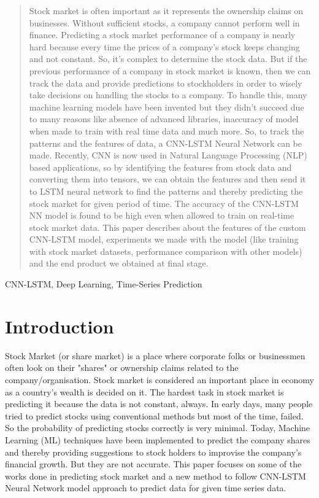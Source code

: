 \documentclass[conference]{IEEEtran}
\begin{document}
\begin{abstract}
Stock market is often important as it represents the ownership claims on businesses. Without sufficient stocks, a company cannot perform well in finance. Predicting a stock market performance of a company is nearly hard because every time the prices of a company’s stock keeps changing and not constant. So, it’s complex to determine the stock data. But if the previous performance of a company in stock market is known, then we can track the data and provide predictions to stockholders in order to wisely take decisions on handling the stocks to a company. To handle this, many machine learning models have been invented but they didn't succeed due to many reasons like absence of advanced libraries, inaccuracy of model when made to train with real time data and much more. So, to track the patterns and the features of data, a CNN-LSTM Neural Network can be made. Recently, CNN is now used in Natural Language Processing (NLP) based applications, so by identifying the features from stock data and converting them into tensors, we can obtain the features and then send it to LSTM neural network to find the patterns and thereby predicting the stock market for given period of time. The accuracy of the CNN-LSTM NN model is found to be high even when allowed to train on real-time stock market data. This paper describes about the features of the custom CNN-LSTM model, experiments we made with the model (like training with stock market datasets, performance comparison with other models) and the end product we obtained at final stage.
\end{abstract}

\begin{IEEEkeywords}
CNN-LSTM, Deep Learning, Time-Series Prediction
\end{IEEEkeywords}

\section{Introduction}
Stock Market (or share market) is a place where corporate folks or businessmen often look on their "shares" or ownership claims related to the company/organisation. Stock market is considered an important place in economy as a country's wealth is decided on it. The hardest task in stock market is predicting it because the data is not constant, always. In early days, many people tried to predict stocks using conventional methods but most of the time, failed. So the probability of predicting stocks correctly is very minimal. Today, Machine Learning (ML) techniques have been implemented to predict the company shares and thereby providing suggestions to stock holders to improvise the company's financial growth. But they are not accurate. This paper focuses on some of the works done in predicting stock market and a new method to follow CNN-LSTM Neural Network model approach to predict data for given time series data.
\end{document}
